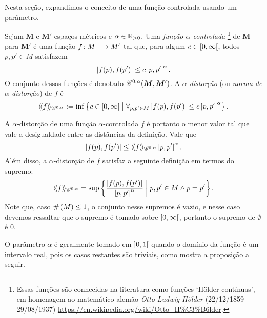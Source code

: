 Nesta seção, expandimos o conceito de uma função controlada usando um parâmetro.

\begin{definition}
Sejam $\bm M$ e $\bm M'$ espaços métricos e $\alpha \in \mathbb{R}_{>0}$. Uma \emph{função $\alpha$-controlada}%
	\footnote{Essas funções são conhecidas na literatura como funções `Hölder contínuas', em homenagem ao matemático alemão \emph{Otto Ludwig Hölder} (22/12/1859 – 29/08/1937) \url{https://en.wikipedia.org/wiki/Otto_H\%C3\%B6lder}.} %
de $\bm M$ para $\bm M'$ é uma função $f\colon \allowbreak M \longrightarrow M'$ tal que, para algum $c \in \left[0,\allowbreak \infty\right[$, todos $p,p' \in M$ satisfazem
	\begin{equation*}
	\left\vert{f(p)},{f(p')}\right\vert \leq c\left\vert{p},{p'}\right\vert^\alpha.
	\end{equation*}
O conjunto dessas funções é denotado $\mathscr{C}^{0,\alpha}(\bm M, \bm M')$. A \emph{$\alpha$-distorção} (ou \emph{norma de $\alpha$-distorção}) de $f$ é
	\begin{equation*}
	\langle\!\langle{f}\rangle\!\rangle_{\mathscr{C}^{0,\alpha}} := \inf\left\{ c \in \left[0,\allowbreak \infty\right[ \;\middle\vert\; \forall_{p,p' \in M} \left\vert{f(p)},{f(p')}\right\vert \leq c\left\vert{p},{p'}\right\vert^\alpha \right\}.
	\end{equation*}
\end{definition}

A $\alpha$-distorção de uma função $\alpha$-controlada $f$ é portanto o menor valor tal que vale a desigualdade entre as distâncias da definição. Vale que
	\begin{equation*}
	\left\vert{f(p)},{f(p')}\right\vert \leq \langle\!\langle{f}\rangle\!\rangle_{\mathscr{C}^{0,\alpha}}\left\vert{p},{p'}\right\vert^\alpha.
	\end{equation*}
Além disso, a $\alpha$-distorção de $f$ satisfaz a seguinte definição em termos do supremo:
	\begin{equation*}
	\distor{f}_{\Cont^{0,\alpha}} = \sup \set{\frac{\dist{f(p)}{f(p')}}{\dist{p}{p'}^\alpha}}{p,p' \in M \land p \neq p'}.
	\end{equation*}
Note que, caso $\#\left({M}\right) \leq 1$, o conjunto nesse supremos é vazio, e nesse caso devemos ressaltar que o supremo é tomado sobre $\left[0,\allowbreak \infty\right[$, portanto o supremo de $\emptyset$ é $0$.




O parâmetro $\alpha$ é geralmente tomado em $\left]0,\allowbreak 1\right[$ quando o domínio da função é um intervalo real, pois os casos restantes são triviais, como mostra a proposição a seguir.


